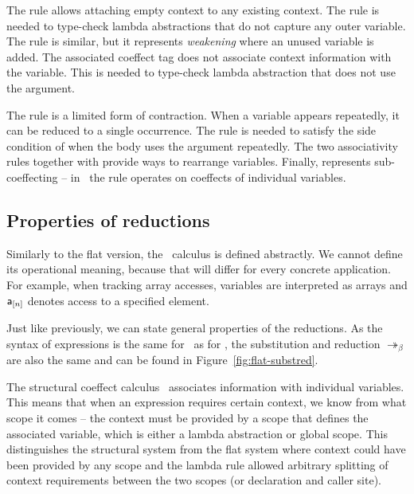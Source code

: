 The  rule allows attaching empty context to any existing context. The rule 
is needed to type-check lambda abstractions that do not capture any outer variable.
The  rule is similar, but it represents \emph{weakening} where an unused variable is 
added. The associated coeffect tag does not associate context information with the variable.
This is needed to type-check lambda abstraction that does not use the argument.

The  rule is a limited form of contraction. When a variable appears repeatedly,
it can be reduced to a single occurrence. The rule is needed to satisfy the side condition
of  when the body uses the argument repeatedly. The two associativity rules
together with  provide ways to rearrange variables. Finally,  represents
sub-coeffecting -- in \clstr~the rule operates on coeffects of individual variables.


\subsection{Properties of reductions}
\label{sec:structural-metatheory}
Similarly to the flat version, the \clstr~calculus is defined abstractly. We cannot define its
operational meaning, because that will differ for every concrete application. For example,
when tracking array accesses, variables are interpreted as arrays and $\textnormal{\sffamily a}_{[n]}$ denotes
access to a specified element. 

Just like previously, we can state general properties of the reductions. As the syntax of expressions
is the same for \clstr~as for \clflt, the substitution and reduction $\twoheadrightarrow_\beta$ 
are also the same and can be found in Figure~\ref{fig:flat-substred}.

The structural coeffect calculus \clstr~associates information with individual variables. This means
that when an expression requires certain context, we know from what scope it comes -- the
context must be provided by a scope that defines the associated variable, which is either a
lambda abstraction or global scope. This distinguishes the structural system from the flat system
where context could have been provided by any scope and the lambda rule allowed arbitrary 
splitting of context requirements between the two scopes (or declaration and caller site).

